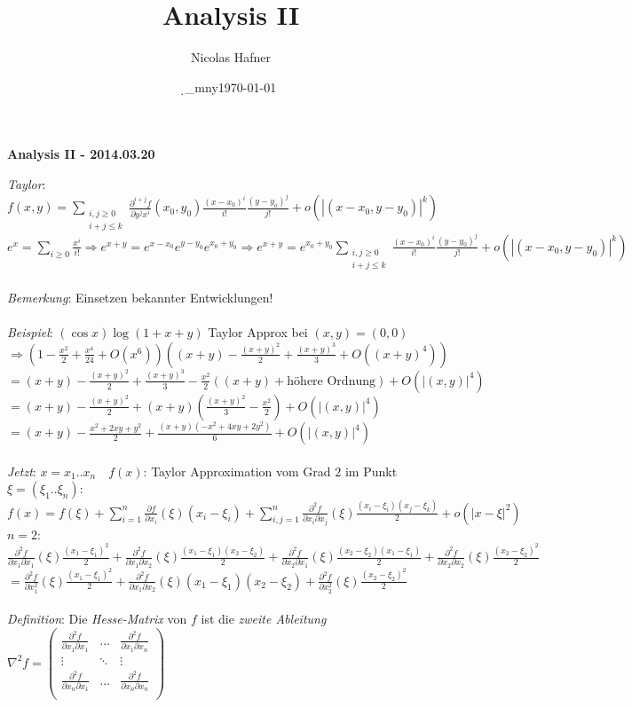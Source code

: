 \documentclass[12pt,a4paper,titlepage]{article}
\author{Nicolas Hafner}
\title{Analysis II}
\date{\d_mny\today}
\renewcommand{\d}{\partial}
\begin{document}
	
\begin{center}{\bfseries\Huge Analysis II - 2014.03.20}\end{center}
\textit{Taylor}: $f(x,y)=\sum\limits_{\substack{i,j\geq 0 \\ i+j\leq k}}\frac{\d^{i+j}f}{\d y^jx^i}(x_0,y_0)\frac{(x-x_0)^i}{i!}\frac{(y-y_o)^j}{j!}+o(|(x-x_0,y-y_0)|^{k})$ \\
$e^x=\sum\limits_{i\geq 0}\frac{x^i}{i!} \Rightarrow e^{x+y}=e^{x-x_0}e^{y-y_0}e^{x_0+y_0} \Rightarrow e^{x+y}=e^{x_0+y_0}\sum\limits_{\substack{i,j\geq 0 \\ i+j\leq k}}\frac{(x-x_0)^i}{i!}\frac{(y-y_0)^j}{j!}+o(|(x-x_0,y-y_0)|^{k})$ \\
\\
\textit{Bemerkung}: Einsetzen bekannter Entwicklungen! \\
\\
\textit{Beispiel}: $(\cos x)\log(1+x+y)$ Taylor Approx bei $(x,y)=(0,0)$ \\
$\Rightarrow (1-\frac{x^2}{2}+\frac{x^4}{24}+O(x^6))((x+y)-\frac{(x+y)^2}{2}+\frac{(x+y)^3}{3}+O((x+y)^4))$ \\
$= (x+y)-\frac{(x+y)^2}{2}+\frac{(x+y)^3}{3}-\frac{x^2}{2}((x+y)+\text{höhere Ordnung})+O(|(x,y)|^4)$ \\
$= (x+y)-\frac{(x+y)^2}{2}+(x+y)(\frac{(x+y)^2}{3}-\frac{x^2}{2})+O(|(x,y)|^4)$ \\
$= (x+y)-\frac{x^2+2xy+y^2}{2}+\frac{(x+y)(-x^2+4xy+2y^2)}{6}+O(|(x,y)|^4)$ \\
\\
\textit{Jetzt}: $x=x_1..x_n \quad f(x)$: Taylor Approximation vom Grad $2$ im Punkt $\xi=(\xi_1..\xi_n)$: \\
$f(x)=f(\xi)+\sum_{i=1}^n\frac{\d f}{\d x_i}(\xi)(x_i-\xi_i)+\sum_{i,j=1}^n\frac{\d^2 f}{\d x_i\d x_j}(\xi)\frac{(x_i-\xi_i)(x_j-\xi_k)}{2}+o(|x-\xi|^2)$ \\
\underline{$n=2$}: $\frac{\d^2 f}{\d x_1\d x_1}(\xi)\frac{(x_1-\xi_1)^2}{2}+\frac{\d^2f}{\d x_1\d x_2}(\xi)\frac{(x_1-\xi_1)(x_2-\xi_2)}{2}+\frac{\d^2 f}{\d x_2\d x_1}(\xi)\frac{(x_2-\xi_2)(x_1-\xi_1)}{2}+\frac{\d^2f}{\d x_2\d x_2}(\xi)\frac{(x_2-\xi_2)^2}{2}$ \\
$=\frac{\d^2 f}{\d x_1^2}(\xi)\frac{(x_1-\xi_1)^2}{2}+\frac{\d^2 f}{\d x_1\d x_2}(\xi)(x_1-\xi_1)(x_2-\xi_2)+\frac{\d^2 f}{\d x_2^2}(\xi)\frac{(x_2-\xi_2)^2}{2}$ \\
\\
\textit{Definition}: Die \emph{Hesse-Matrix} von $f$ ist die \emph{zweite Ableitung}
$\nabla^2f=\begin{pmatrix}
  \frac{\d^2f}{\d x_1\d x_1} & \hdots & \frac{\d^2f}{\d x_1\d x_n} \\
  \vdots & \ddots & \vdots \\
  \frac{\d^2f}{\d x_n\d x_1} & \hdots & \frac{\d^2f}{\d x_n\d x_n} \\
\end{pmatrix}$
\end{document}
